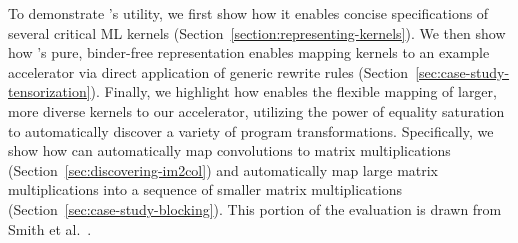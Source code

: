 To demonstrate \g's utility,
  we first show how it enables
  concise specifications of several
  critical ML kernels
  (Section~\ref{section:representing-kernels}).
We then show how
  \g's pure, binder-free
  representation enables mapping kernels
  to an example accelerator via
  direct application of generic rewrite rules
  (Section~\ref{sec:case-study-tensorization}).
Finally,
  we highlight how \g
  enables the
  flexible mapping of
  larger, more diverse kernels
  to our accelerator,
  utilizing the power
  of equality saturation
  to automatically discover
  a variety of program transformations.
Specifically,
  we show how \g can automatically
  map convolutions to matrix multiplications
  (Section~\ref{sec:discovering-im2col})
  and automatically
  map large matrix multiplications into a
  sequence of smaller matrix multiplications
  (Section~\ref{sec:case-study-blocking}).
This portion of the evaluation is drawn from
  Smith et al.~\cite{smith2021pure}.
  
  


  
  
  
  

